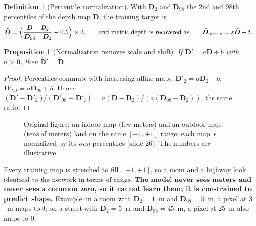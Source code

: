 \documentclass[11pt,a4paper]{article}
\numberwithin{equation}{section}
\theoremstyle{plain}
\newtheorem{proposition}[theorem]{Proposition}
\theoremstyle{definition}
\newtheorem{definition}[theorem]{Definition}
\begin{document}
\begin{definition}[Percentile normalization]
With $\bm D_2$ and $\bm D_{98}$ the 2nd and 98th percentiles of the depth map $\bm D$, the training target is
\begin{equation}
\tilde{\bm D}=\Bigl(\frac{\bm D-\bm D_2}{\bm D_{98}-\bm D_2}-0.5\Bigr)\times2,\qquad\text{and metric depth is recovered as}\qquad \tilde{\bm D}_{\text{metric}}=s\tilde{\bm D}+t .
\end{equation}
\end{definition}

\begin{proposition}[Normalization removes scale and shift]
If $\bm D'=a\bm D+b$ with $a>0$, then $\tilde{\bm D}'=\tilde{\bm D}$.
\end{proposition}
\begin{proof}
Percentiles commute with increasing affine maps: $\bm D'_2=a\bm D_2+b$, $\bm D'_{98}=a\bm D_{98}+b$. Hence $(\bm D'-\bm D'_2)/(\bm D'_{98}-\bm D'_2)=a(\bm D-\bm D_2)/(a(\bm D_{98}-\bm D_2))$, the same ratio.
\end{proof}

\begin{figure}[H]
\centering
{}
\caption{Original figure: an indoor map (few meters) and an outdoor map (tens of meters) land on the same $[-1,+1]$ range; each map is normalized by its \emph{own} percentiles (slide 26). The numbers are illustrative.}
\end{figure}

\begin{intuition}
Every training map is stretched to fill $[-1,+1]$, so a room and a highway look identical to the network in terms of range. \textbf{The model never sees meters and never sees a common zero, so it cannot learn them; it is constrained to predict shape.} Example: in a room with $\bm D_2=1$~m and $\bm D_{98}=5$~m, a pixel at $3$~m maps to $0$; on a street with $\bm D_2=5$~m and $\bm D_{98}=45$~m, a pixel at $25$~m also maps to $0$.
\end{intuition}
\end{document}
